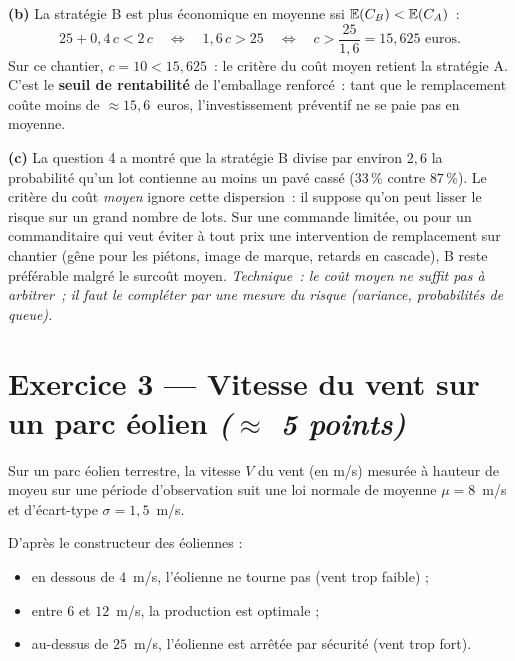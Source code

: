 \begin{enumerate}
{\begin{solution}
      \textbf{(b)} La stratégie B est plus économique en moyenne ssi $\mathbb{E}(C_B) < \mathbb{E}(C_A)$~:
      \[
        25 + 0{,}4\,c < 2\,c
        \quad\Longleftrightarrow\quad
        1{,}6\,c > 25
        \quad\Longleftrightarrow\quad
        c > \dfrac{25}{1{,}6} = 15{,}625 \text{ euros.}
      \]
      Sur ce chantier, $c = 10 < 15{,}625$~: le critère du coût moyen retient la stratégie A. C'est le \textbf{seuil de rentabilité} de l'emballage renforcé~: tant que le remplacement coûte moins de $\approx 15{,}6$~euros, l'investissement préventif ne se paie pas en moyenne.

      \medskip

      \textbf{(c)} La question 4 a montré que la stratégie B divise par environ $2{,}6$ la probabilité qu'un lot contienne au moins un pavé cassé ($33\,\%$ contre $87\,\%$). Le critère du coût \emph{moyen} ignore cette dispersion~: il suppose qu'on peut \og lisser \fg{} le risque sur un grand nombre de lots. Sur une commande limitée, ou pour un commanditaire qui veut éviter à tout prix une intervention de remplacement sur chantier (gêne pour les piétons, image de marque, retards en cascade), B reste préférable malgré le surcoût moyen. \emph{Technique~: le coût moyen ne suffit pas à arbitrer~; il faut le compléter par une mesure du risque (variance, probabilités de queue).}
    \end{solution}
  }{}

\end{enumerate}

\bigskip

\section*{Exercice 3 --- Vitesse du vent sur un parc éolien \hfill {\normalfont \itshape ($\approx$ 5 points)}}

Sur un parc éolien terrestre, la vitesse $V$ du vent (en m/s) mesurée à hauteur de moyeu sur une période d'observation suit une loi normale de moyenne $\mu = 8$~m/s et d'écart-type $\sigma = 1{,}5$~m/s.

\medskip

D'après le constructeur des éoliennes :
\begin{itemize}\setlength{\itemsep}{0.1em}
  \item en dessous de $4$~m/s, l'éolienne ne tourne pas (vent trop faible) ;
  \item entre $6$ et $12$~m/s, la production est optimale ;
  \item au-dessus de $25$~m/s, l'éolienne est arrêtée par sécurité (vent trop fort).
\end{itemize}

